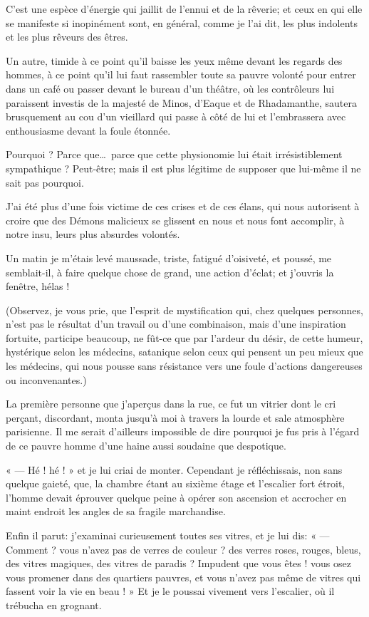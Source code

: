 C’est une espèce d’énergie qui jaillit
de l’ennui et de la rêverie; et ceux en qui elle se
manifeste si inopinément sont, en général, comme je
l’ai dit, les plus indolents et les plus rêveurs des
êtres.

Un autre, timide à ce point qu’il baisse les yeux même
devant les regards des hommes, à ce point qu’il lui
faut rassembler toute sa pauvre volonté pour entrer dans un café ou
passer devant le bureau d’un théâtre, où les
contrôleurs lui paraissent investis de la majesté de Minos,
d’Eaque et de Rhadamanthe, sautera brusquement au cou
d’un vieillard qui passe à côté de lui et
l’embrassera avec enthousiasme devant la foule
étonnée.

Pourquoi ? Parce que\ldots\ parce que cette physionomie lui était
irrésistiblement sympathique ? Peut{}-être; mais il est plus légitime
de supposer que lui{}-même il ne sait pas pourquoi.

J’ai été plus d’une fois victime de
ces crises et de ces élans, qui nous autorisent à croire que des Démons
malicieux se glissent en nous et nous font accomplir, à notre insu,
leurs plus absurdes volontés.

Un matin je m’étais levé maussade, triste, fatigué
d’oisiveté, et poussé, me semblait{}-il, à faire
quelque chose de grand, une action d’éclat; et
j’ouvris la fenêtre, hélas !

(Observez, je vous prie, que l’esprit de mystification
qui, chez quelques personnes, n’est pas le résultat
d’un travail ou d’une combinaison,
mais d’une inspiration fortuite, participe beaucoup,
ne fût{}-ce que par l’ardeur du désir, de cette
humeur, hystérique selon les médecins, satanique selon ceux qui pensent
un peu mieux que les médecins, qui nous pousse sans résistance vers une
foule d’actions dangereuses ou inconvenantes.)

La première personne que j’aperçus dans la rue, ce fut
un vitrier dont le cri perçant, discordant, monta
jusqu’à moi à travers la lourde et sale atmosphère
parisienne. Il me serait d’ailleurs impossible de dire
pourquoi je fus pris à l’égard de ce pauvre homme
d’une haine aussi soudaine que despotique.

« --- Hé ! hé ! » et je lui criai de monter. Cependant je réfléchissais,
non sans quelque gaieté, que, la chambre étant au sixième étage et
l’escalier fort étroit, l’homme
devait éprouver quelque peine à opérer son ascension et accrocher en
maint endroit les angles de sa fragile marchandise.

Enfin il parut: j’examinai curieusement toutes ses
vitres, et je lui dis: « --- Comment ? vous n’avez pas
de verres de couleur ? des verres roses, rouges, bleus, des vitres
magiques, des vitres de paradis ? Impudent que vous êtes ! vous osez
vous promener dans des quartiers pauvres, et vous
n’avez pas même de vitres qui fassent voir la vie en
beau ! » Et je le poussai vivement vers l’escalier, où
il trébucha en grognant.

